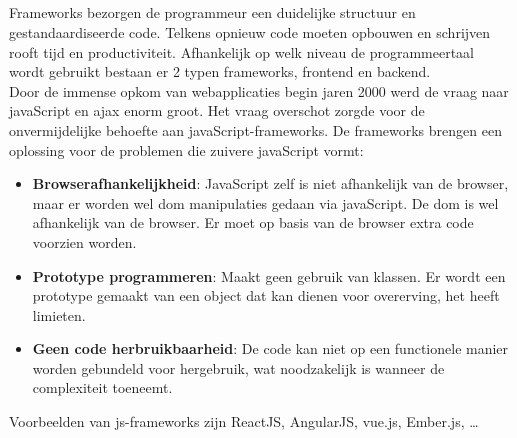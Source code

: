 \subsection{}
\label{sec:jsFrameworks}

Frameworks bezorgen de programmeur een duidelijke structuur en gestandaardiseerde code. Telkens opnieuw code moeten opbouwen en schrijven rooft tijd en productiviteit. Afhankelijk op welk niveau de programmeertaal wordt gebruikt bestaan er 2 typen frameworks, frontend en backend.\\
Door de immense opkom van webapplicaties begin jaren 2000 werd de vraag naar javaScript en \gls{ajax} enorm groot. Het vraag overschot zorgde voor de onvermijdelijke behoefte aan javaScript-frameworks. De frameworks brengen een oplossing voor de problemen die zuivere javaScript vormt:

\begin{itemize}[label={}]
  \item \textbf{Browserafhankelijkheid}:
  JavaScript zelf is niet afhankelijk van de browser, maar er worden wel \gls{dom} manipulaties gedaan via javaScript. De \gls{dom} is wel afhankelijk van de browser. Er moet op basis van de browser extra code voorzien worden. \newline
  \item \textbf{Prototype programmeren}:
  Maakt geen gebruik van klassen. Er wordt een prototype gemaakt van een object dat kan dienen voor overerving, het heeft limieten. \newline
   \item \textbf{Geen code herbruikbaarheid}:
  De code kan niet op een functionele manier worden gebundeld voor hergebruik, wat noodzakelijk is wanneer de complexiteit toeneemt.
\end{itemize}

Voorbeelden van \gls{js}-frameworks zijn ReactJS, AngularJS, vue.js, Ember.js, \dots

\subsection{}
\label{sec:jsLibrary}

